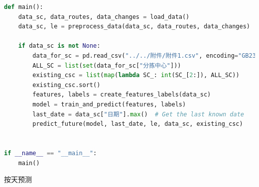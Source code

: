 \documentclass[UTF8,a4paper,10 pt]{article}%
\begin{document}
\begin{lstlisting}[language=python]
def main():
    data_sc, data_routes, data_changes = load_data()
    data_sc, le = preprocess_data(data_sc, data_routes, data_changes)

    if data_sc is not None:
        data_for_sc = pd.read_csv("../../附件/附件1.csv", encoding="GB2312")
        ALL_SC = list(set(data_for_sc["分拣中心"]))
        existing_csc = list(map(lambda SC_: int(SC_[2:]), ALL_SC))
        existing_csc.sort()
        features, labels = create_features_labels(data_sc)
        model = train_and_predict(features, labels)
        last_date = data_sc["日期"].max()  # Get the last known date
        predict_future(model, last_date, le, data_sc, existing_csc)


if __name__ == "__main__":
    main()

\end{lstlisting}
\noindent 按天预测
\end{document}
